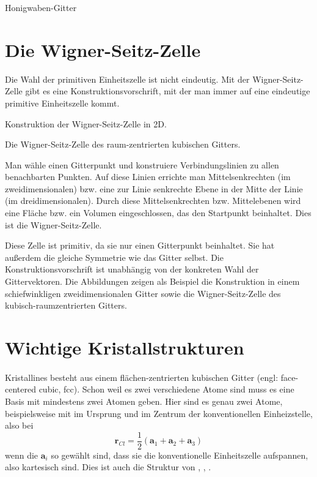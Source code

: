 \begin{marginfigure}

\caption{Honigwaben-Gitter}
\end{marginfigure}


\section{Die Wigner-Seitz-Zelle}

Die Wahl der primitiven Einheitszelle ist nicht eindeutig. Mit der Wigner-Seitz-Zelle gibt es eine Konstruktionsvorschrift, mit der man immer auf eine eindeutige primitive Einheitszelle kommt.



\begin{marginfigure}
\caption{Konstruktion der Wigner-Seitz-Zelle in 2D.}
\end{marginfigure}

\begin{marginfigure}
\caption{Die Wigner-Seitz-Zelle des raum-zentrierten kubischen Gitters.}
\end{marginfigure}

Man wähle einen Gitterpunkt und konstruiere Verbindungslinien zu allen benachbarten Punkten. Auf diese Linien errichte man Mittelsenkrechten (im zweidimensionalen) bzw. eine zur Linie senkrechte Ebene in der Mitte der Linie (im dreidimensionalen). Durch diese Mittelsenkrechten bzw. Mittelebenen wird eine Fläche bzw. ein Volumen eingeschlossen, das den Startpunkt beinhaltet. Dies ist die Wigner-Seitz-Zelle.

Diese Zelle ist primitiv, da sie nur einen Gitterpunkt beinhaltet. Sie hat außerdem die gleiche Symmetrie wie das Gitter selbst. Die Konstruktionsvorschrift ist unabhängig von der konkreten Wahl der Gittervektoren. Die Abbildungen zeigen als Beispiel die Konstruktion in einem schiefwinkligen zweidimensionalen Gitter sowie die Wigner-Seitz-Zelle des kubisch-raumzentrierten Gitters.


\section{Wichtige Kristallstrukturen}


\paragraph{}
Kristallines  besteht aus einem flächen-zentrierten kubischen Gitter (engl: face-centered cubic, fcc). Schon weil es zwei verschiedene Atome sind muss es eine Basis mit mindestens zwei Atomen geben. Hier sind es genau zwei Atome,  beispielsweise mit  im Ursprung und  im Zentrum der konventionellen Einheizstelle, also bei
\begin{equation}
 \mathbf{r}_{Cl} = \frac{1}{2} \left(\mathbf{a}_1 + \mathbf{a}_2 +  \mathbf{a}_3  \right)
\end{equation}
wenn die $\mathbf{a}_i$ so gewählt sind, dass sie die konventionelle Einheitszelle aufspannen, also kartesisch sind. Dies ist auch die Struktur von , , .


